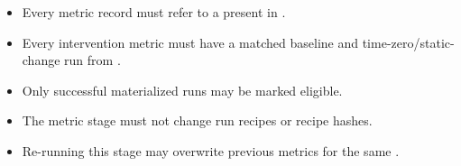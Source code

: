 \documentclass[11pt]{article}
\begin{document}
\begin{itemize}
\item Every metric record must refer to a  present in .
\item Every intervention metric must have a matched baseline and time-zero/static-change run from .
\item Only successful materialized runs may be marked eligible.
\item The metric stage must not change run recipes or recipe hashes.
\item Re-running this stage may overwrite previous metrics for the same .
\end{itemize}
\end{document}
